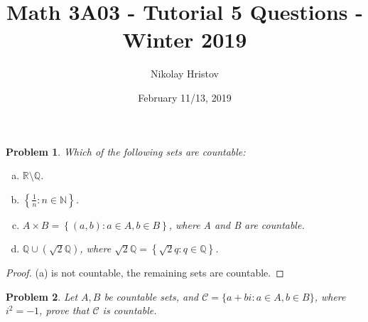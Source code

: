 \documentclass[11pt]{article}
\theoremstyle{plain}
\newtheorem{problem}{Problem}
\theoremstyle{remark}
\newcommand {\mbR} {\mathbb R}
\newcommand {\mbN} {\mathbb N}
\newcommand {\mbQ} {\mathbb Q}
\begin{document}
	\title{Math 3A03 - Tutorial 5 Questions - Winter 2019}
	\author{Nikolay Hristov}
	\date{February 11/13, 2019}
	\maketitle
	
		\begin{problem}
		Which of the following sets are countable:
		
		\begin{enumerate}[(a)]
			\item $\mbR \setminus \mbQ$.
			
			\item $\left\{ \frac 1 n : n \in \mbN \right\}$.
			
			\item $A\times B = \left\{ (a,b): a\in A, b\in B \right\}$, where A and B are countable.
			
			\item $\mbQ \cup \left(\sqrt 2 \mbQ \right)$, where $\sqrt 2 \mbQ = \left\{\sqrt 2 q: q\in \mbQ \right\}$.
		\end{enumerate}
	\end{problem}

	\begin{proof}
		(a) is not countable, the remaining sets are countable.
	\end{proof}

	\begin{problem}
		Let $A,B$ be countable sets, and $\mathcal C=\{a+bi: a \in A,b\in B\}$, where $i^2=-1$, prove that $\mathcal C$ is countable.
	\end{problem}
\end{document}
